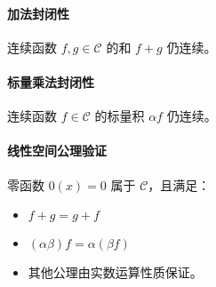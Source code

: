 \paragraph{加法封闭性}  
连续函数 \(f, g \in \mathcal{C}\) 的和 \(f + g\) 仍连续。

\paragraph{标量乘法封闭性}  
连续函数 \(f \in \mathcal{C}\) 的标量积 \(\alpha f\) 仍连续。

\paragraph{线性空间公理验证}  
零函数 \(0(x) = 0\) 属于 \(\mathcal{C}\)，且满足：
\begin{itemize}
    \item \(f + g = g + f\)
    \item \((\alpha \beta)f = \alpha (\beta f)\)
    \item 其他公理由实数运算性质保证。
\end{itemize}
